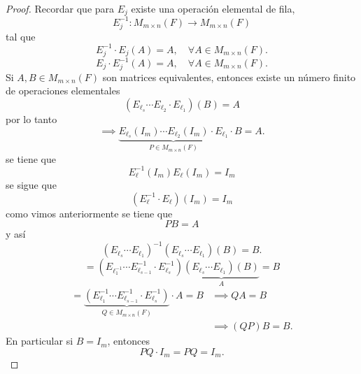 \documentclass[12pt,a4paper]{book}
\begin{document}
    \begin{proof}
        Recordar que para $E_{j}$ existe una operación elemental de fila,
        \begin{equation*}
            E^{-1}_{j}:M_{m\times n}(F)\to M_{m\times n}(F)
        \end{equation*}
        tal que
        \begin{equation*}
            E_{j}^{-1}\cdot E_{j}(A)=A,\quad\forall A\in M_{m\times n}(F).
        \end{equation*}
        \begin{equation*}
            E_{j}\cdot E_{j}^{-1}(A)=A,\quad\forall A\in M_{m\times n}(F).
        \end{equation*}
        Si $A,B\in M_{m\times n}(F)$ son matrices equivalentes, entonces existe un número finito
        de operaciones elementales
        \begin{equation*}
            (E_{\ell_{s}}\cdots E_{\ell_{2}}\cdot E_{\ell_{1}})(B)=A
        \end{equation*}
        por lo tanto
        \begin{equation*}
            \implies\underbrace{E_{\ell_{s}}(I_{m})\cdots E_{\ell_{2}}(I_{m})\cdot E_{\ell_{1}}}_{P\in M_{m\times n}(F)}\cdot B=A.
        \end{equation*}
        se tiene que
        \begin{equation*}
            E_{\ell}^{-1}(I_{m})E_{\ell}(I_{m})=I_{m}
        \end{equation*}
        se sigue que
        \begin{equation*}
            (E_{\ell}^{-1}\cdot E_{\ell})(I_{m})=I_{m}
        \end{equation*}
        como vimos anteriormente se tiene que
        \begin{equation*}
            PB=A
        \end{equation*}
        y así
        \begin{equation*}
            (E_{\ell_{s}}\cdots E_{\ell_{1}})^{-1}(E_{\ell_{s}}\cdots E_{\ell_{1}})(B)=B.
        \end{equation*}
        \begin{equation*}
            =(E_{\ell_{1}^{-1}}\cdots E_{\ell_{s-1}}^{-1}\cdot E_{\ell_{s}}^{-1})\underbrace{(E_{\ell_{s}}\cdots E_{\ell_{1}})(B)}_{A}=B
        \end{equation*}
        \begin{align*}
            =\underbrace{(E_{\ell_{1}}^{-1}\cdots E_{\ell_{s-1}}^{-1}\cdot E_{\ell_{s}}^{-1})}_{Q\in M_{m\times n}(F)}\cdot A=B&\implies QA=B\\
            &\implies (QP)B=B.
        \end{align*}
        En particular si $B=I_{m}$, entonces
        \begin{equation*}
            PQ\cdot I_{m}=PQ=I_{m}.
        \end{equation*}
    \end{proof}
\end{document}

